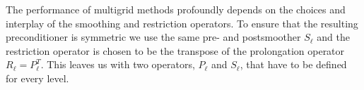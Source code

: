 \documentclass[a4paper,10pt,3p,final,pdftex]{elsarticle}
\begin{document}



The performance of multigrid methods profoundly depends on the choices and
interplay of the smoothing and restriction operators. To ensure that the
resulting preconditioner is symmetric we use the same pre- and postsmoother
$S_\ell$ and the restriction operator is chosen to be the transpose of the
prolongation operator $R_\ell = P_\ell^T$. This leaves us with two operators,
$P_\ell$ and $S_\ell$, that have to be defined for every level.

\end{document}
